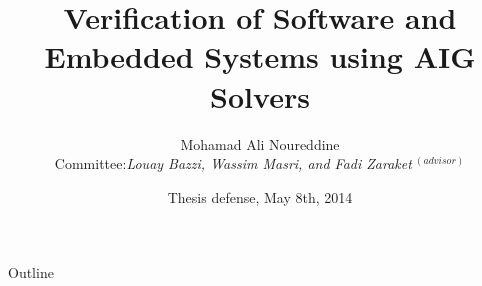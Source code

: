 \documentclass[]{beamer}
\begin{document}
\title [Thesis Defense] %
{Verification of Software and Embedded Systems using AIG Solvers}
 

\author[M. A. Noureddine] %
{Mohamad Ali Noureddine \\
\vspace{2em}
{\footnotesize 
  Committee:{\em Louay Bazzi, Wassim Masri, and Fadi Zaraket$~^\mathit{(advisor)}$}
}
}


\date[May 2014] %
{Thesis defense, May 8th, 2014}

\begin{frame}
  \titlepage
\end{frame}

\begin{frame}{Outline}
\tableofcontents
\end{frame}


\end{document}
